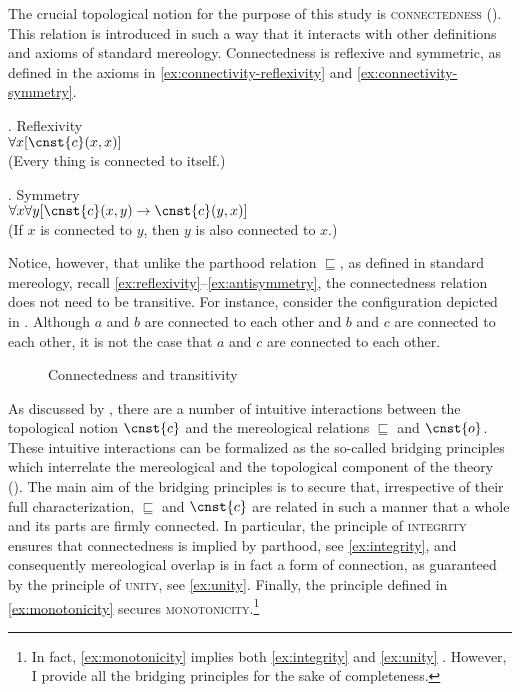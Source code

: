 The crucial topological notion for the purpose of this study is \textsc{connectedness} (). This relation is introduced in such a way that it interacts with other definitions and axioms of standard mereology. Connectedness is reflexive and symmetric, as defined in the axioms in \ref{ex:connectivity-reflexivity} and \ref{ex:connectivity-symmetry}.

\ex. Reflexivity \citep[p. 52; adapted]{casati_varzi1999parts}\label{ex:connectivity-reflexivity}\\
$\forall x[\cnst{c}(x,x)]$\\
(Every thing is connected to itself.)
	
\ex. Symmetry \citep[p. 52; adapted]{casati_varzi1999parts}\label{ex:connectivity-symmetry}\\
$\forall x\forall y[\cnst{c}(x,y) \rightarrow \cnst{c}(y,x)]$\\
(If $x$ is connected to $y$, then $y$ is also connected to $x$.)

Notice, however, that unlike the parthood relation $\sqsubseteq$, as defined in standard mereology, recall \ref{ex:reflexivity}--\ref{ex:antisymmetry}, the connectedness relation  does not need to be transitive. For instance, consider the configuration depicted in . Although $a$ and $b$ are connected to each other and $b$ and $c$ are connected to each other, it is not the case that $a$ and $c$ are connected to each other.

\begin{figure}[h!]
\centering
{}
\caption{Connectedness and transitivity}
\label{fig:connectedness-transitivity}
\end{figure} 

As discussed by \citet{casati_varzi1999parts}, there are a number of intuitive interactions between the topological notion $\cnst{c}$ and the mereological relations $\sqsubseteq$ and $\cnst{o}$. These intuitive interactions can be formalized as the so-called bridging principles which interrelate the mereological and the topological component of the theory (\citealt{varzi2007spatial}). The main aim of the bridging principles is to secure that, irrespective of their full characterization, $\sqsubseteq$ and $\cnst{c}$ are related in such a manner that a whole and its parts are firmly connected. In particular, the principle of \textsc{integrity} ensures that connectedness is implied by parthood, see \ref{ex:integrity}, and consequently mereological overlap is in fact a form of connection, as guaranteed by the principle of \textsc{unity}, see \ref{ex:unity}. Finally, the principle defined in \ref{ex:monotonicity} secures \textsc{monotonicity}.\footnote{In fact, \ref{ex:monotonicity} implies both \ref{ex:integrity} and \ref{ex:unity} \citep[pp. 981--982]{varzi2007spatial}. However, I provide all the bridging principles for the sake of completeness.}

